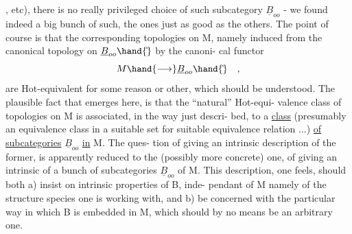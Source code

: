 
\hand{$\Delta$} ,\hand{$\square$} etc), there is no really privileged choice of such subcategory
$\underline{B}_{oo}$ - we found indeed a big bunch of such, the ones just as good as
the others. The point of course is that the corresponding topologies
on M, namely induced from the canonical topology on $\underline{B}_{oo}\hand{\hat{}}$ by the canoni-%
cal functor
\[ M \hand{\longrightarrow} \underline{B}_{oo}\hand{\hat{}} \quad , \]
are Hot-equivalent for some reason or other, which should be understood.
The plausible fact that emerges here, is that the ``natural'' Hot-equi-%
valence class of topologies on M is associated, in the way just descri-%
bed, to a \uline{class} (presumably an equivalence class in a suitable set for
suitable equivalence relation ...) \uline{of subcategories} $\underline{B}_{oo}$ \uline{in} M. The ques-%
tion of giving an intrinsic description of the former, is apparently
reduced to the (possibly more concrete) one, of giving an intrinsic
 of a bunch of subcategories $\underline{B}_{oo}$ of M. This description,
one feels, should both a) insist on intrinsic properties of B, inde-%
pendant of M namely of the structure species one is working with, and
b) be concerned with the particular way in which B is embedded in M,
which should by no means be an arbitrary one.

